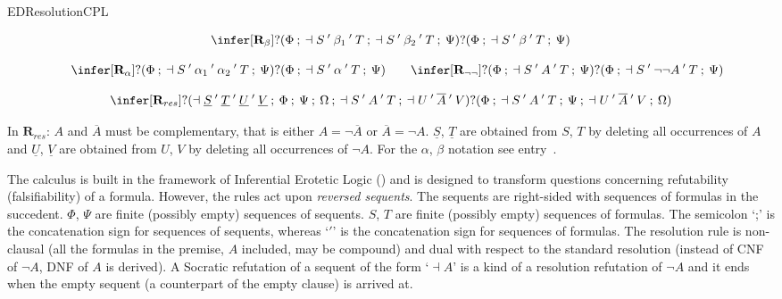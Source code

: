 \begin{entry}{EDResolutionCPL}  




\begin{calculus}


$$\infer[\textbf{R}_{\beta}]
{?(\Phi\:;\:\dashv S\:'\:\beta_{1}\:'\:T\:;\:\dashv S\:'\:\beta_{2}\:'\:T\:;\:\Psi)}
{?(\Phi\:;\:\dashv S\:'\:\beta\:'\:T\:;\:\Psi)} $$

\vspace{-0.3cm}

$$
\quad
\infer[\textbf{R}_{\alpha}]
{?(\Phi\:;\:\dashv S\:'\:\alpha_{1}\:'\:\alpha_{2}\:'\:T\:;\:\Psi)}
{?(\Phi\:;\:\dashv   S\:'\:\alpha\:'\:T\:;\:\Psi)}
\qquad
\infer[\textbf{R}_{\neg\neg}]
{?(\Phi\:;\:\dashv S\:'\:A\:'\:T\:;\:\Psi)}
{?(\Phi\:;\:\dashv S\:'\:\neg\neg A\:'\:T\:;\:\Psi)}$$

\vspace{-0.3cm}

$$\infer[\textbf{R}_{res}]
{?(\dashv \underline{S}\:'\:\underline{T}\:'\:\underline{U}\:'\:\underline{V}\:;\:\Phi\:;\:\Psi\:;\:\Omega\:;\:\dashv S\:'\: A\:'\:T\:;\:\dashv U\:'\:\overline{A}\:'\:V)}
{?(\Phi\:;\:\dashv S\:'\: A\:'\:T\:;\:\Psi\:;\:\dashv U\:'\:\overline{A}\:'\:V\:;\:\Omega )}$$

In $\mathbf{R}_{res}$: $A$ and $\overline{A}$ must be complementary, that is either $A = \lnot \overline{A}$ or $\overline{A} = \lnot A$. $\underline{S}$, $\underline{T}$ are obtained from $S$, $T$ by deleting all occurrences of $A$ and $\underline{U}$, $\underline{V}$ are obtained from $U$, $V$ by deleting all occurrences of $\lnot A$. For the $\alpha$, $\beta$ notation see entry~.
\end{calculus}



\begin{clarifications}
The calculus is built in the framework of Inferential Erotetic Logic (\cite{AW:2013}) and is designed to transform questions concerning refutability (falsifiability) of a formula. However, the rules act upon \textit{reversed sequents}. The sequents are right-sided with sequences of formulas in the succedent. $\Phi$, $\Psi$ are finite (possibly empty) sequences of sequents. $S$, $T$ are finite (possibly empty) sequences of formulas. The semicolon `;' is the concatenation sign for sequences of sequents, whereas `$'$' is the concatenation sign for sequences of formulas. The resolution rule is non-clausal (all the formulas in the premise, $A$ included, may be compound) and dual with respect to the standard resolution (instead of CNF of $\lnot A$, DNF of $A$ is derived). A Socratic refutation of a sequent of the form `$\dashv A$' is a kind of a resolution refutation of $\lnot A$ and it ends when the empty sequent (a counterpart of the empty clause) is arrived at.
\end{clarifications}


\end{entry}
